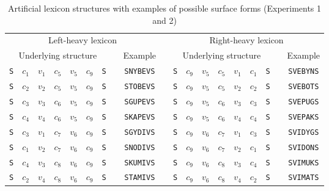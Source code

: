 \documentclass[doc,biblatex,floatsintext]{apa7}
\begin{document}
\begin{table}
\begin{center}
\begin{threeparttable}
\caption{Artificial lexicon structures with examples of possible surface forms (Experiments 1 and 2)}
\footnotesize
\label{table1}
\begin{tabular}{ccccccccccccccccccc}
\toprule
\multicolumn{9}{c}{Left-heavy lexicon} & & \multicolumn{9}{c}{Right-heavy lexicon} \\
\multicolumn{7}{c}{Underlying structure} & & Example & & \multicolumn{7}{c}{Underlying structure} & & Example \\
\texttt{S} & $c_1$ & $v_1$ & $c_5$ & $v_5$ & $c_9$ & \texttt{S} & & \texttt{SNYBEVS} & & \texttt{S} & $c_9$ & $v_5$ & $c_5$ & $v_1$ & $c_1$ & \texttt{S} & & \texttt{SVEBYNS} \\
\texttt{S} & $c_2$ & $v_2$ & $c_5$ & $v_5$ & $c_9$ & \texttt{S} & & \texttt{STOBEVS} & & \texttt{S} & $c_9$ & $v_5$ & $c_5$ & $v_2$ & $c_2$ & \texttt{S} & & \texttt{SVEBOTS} \\
\texttt{S} & $c_3$ & $v_3$ & $c_6$ & $v_5$ & $c_9$ & \texttt{S} & & \texttt{SGUPEVS} & & \texttt{S} & $c_9$ & $v_5$ & $c_6$ & $v_3$ & $c_3$ & \texttt{S} & & \texttt{SVEPUGS} \\
\texttt{S} & $c_4$ & $v_4$ & $c_6$ & $v_5$ & $c_9$ & \texttt{S} & & \texttt{SKAPEVS} & & \texttt{S} & $c_9$ & $v_5$ & $c_6$ & $v_4$ & $c_4$ & \texttt{S} & & \texttt{SVEPAKS} \\
\texttt{S} & $c_3$ & $v_1$ & $c_7$ & $v_6$ & $c_9$ & \texttt{S} & & \texttt{SGYDIVS} & & \texttt{S} & $c_9$ & $v_6$ & $c_7$ & $v_1$ & $c_3$ & \texttt{S} & & \texttt{SVIDYGS} \\
\texttt{S} & $c_1$ & $v_2$ & $c_7$ & $v_6$ & $c_9$ & \texttt{S} & & \texttt{SNODIVS} & & \texttt{S} & $c_9$ & $v_6$ & $c_7$ & $v_2$ & $c_1$ & \texttt{S} & & \texttt{SVIDONS} \\
\texttt{S} & $c_4$ & $v_3$ & $c_8$ & $v_6$ & $c_9$ & \texttt{S} & & \texttt{SKUMIVS} & & \texttt{S} & $c_9$ & $v_6$ & $c_8$ & $v_3$ & $c_4$ & \texttt{S} & & \texttt{SVIMUKS} \\
\texttt{S} & $c_2$ & $v_4$ & $c_8$ & $v_6$ & $c_9$ & \texttt{S} & & \texttt{STAMIVS} & & \texttt{S} & $c_9$ & $v_6$ & $c_8$ & $v_4$ & $c_2$ & \texttt{S} & & \texttt{SVIMATS} \\
\bottomrule
\end{tabular} 
\end{threeparttable}
\end{center} 
\end{table}
\end{document}
